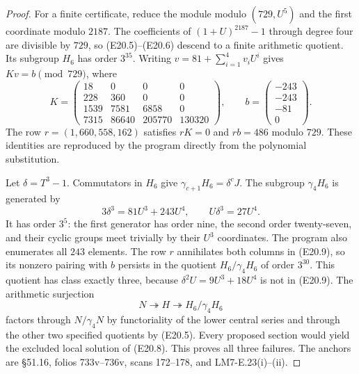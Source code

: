 \documentclass[11pt,oneside]{article}
\begin{document}
\begin{proof}
For a finite certificate, reduce the module
modulo $(729,U^5)$ and the first coordinate
modulo $2187$. The coefficients of
$(1+U)^{2187}-1$ through degree four are
divisible by $729$, so (E20.5)--(E20.6)
descend to a finite arithmetic quotient.
Its subgroup $H_6$ has order $3^{35}$.
Writing $v=81+\sum_{i=1}^4v_iU^i$ gives
$Kv=b\pmod{729}$, where
\[
 K=\begin{pmatrix}
 18&0&0&0\\228&360&0&0\\
 1539&7581&6858&0\\7315&86640&205770&130320
 \end{pmatrix},\qquad
 b=\begin{pmatrix}-243\\-243\\-81\\0\end{pmatrix}.
 \tag{E20.8}
\]
The row $r=(1,660,558,162)$ satisfies
$rK=0$ and $rb=486$ modulo $729$.
These identities are reproduced by the program
directly from the polynomial substitution.

Let $\delta=T^3-1$. Commutators in $H_6$ give
$\gamma_{c+1}H_6=\delta^cJ$. The subgroup
$\gamma_4H_6$ is generated by
\[
       3\delta^3=81U^3+243U^4,
               \qquad U\delta^3=27U^4.
 \tag{E20.9}
\]
It has order $3^5$: the first generator has
order nine, the second order twenty-seven,
and their cyclic groups meet trivially by
their $U^3$ coordinates. The program also
enumerates all $243$ elements. The row $r$
annihilates both columns in (E20.9), so its
nonzero pairing with $b$ persists in the
quotient $H_6/\gamma_4H_6$ of order $3^{30}$.
This quotient has class exactly three,
because $\delta^2U=9U^3+18U^4$ is not in
(E20.9). The arithmetic surjection
\[
             N\twoheadrightarrow H
                 \twoheadrightarrow H_6/\gamma_4H_6
 \tag{E20.10}
\]
factors through $N/\gamma_4N$ by functoriality
of the lower central series and through the
other two specified quotients by (E20.5).
Every proposed section would yield the
excluded local solution of (E20.8).
This proves all three failures. The anchors
are \S51.16, folios 733v--736v, scans
172--178, and LM7-E.23(i)--(ii).
\end{proof}
\end{document}
